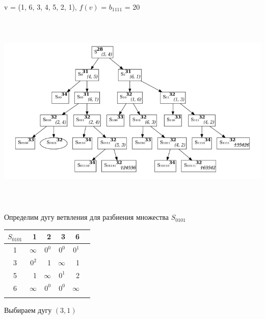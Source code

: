 \documentclass[12pt]{article}
\begin{document}
v = (1, 6, 3, 4, 5, 2, 1), $f(v)$ = $b_{1111}$  = 20\\
\begin{flushleft}
 
\includegraphics[width = 14cm, height = 9.5cm]{pictures/picture_03.jpg}\\
\end{flushleft}
\vspace{3cm}
\begin{flushleft}
 
Определим дугу ветвления для разбиения множества $S_{0101}$\\
\end{flushleft}

\begin{flushleft}
 \begin{tabular}{c||rrrr||c}
$S_{0101}$ & 1 &2 & 3  & 6 & \\
\hline
\hline
1 & $\infty$ & $0^0$ & $0^0$   & $0^1$ & \\
3 & $0^2$ & 1 & $\infty$   & 1 & \\
5 & 1 &  $\infty$ &  $0^1$ & 2 &\\
6 & $\infty$ & $0^0$ & $0^0$  & $\infty$ & \\
\hline
\hline
 & &   &  &   & \\
\end{tabular}
\end{flushleft}

Выбираем дугу $(3,1)$
\end{document}
